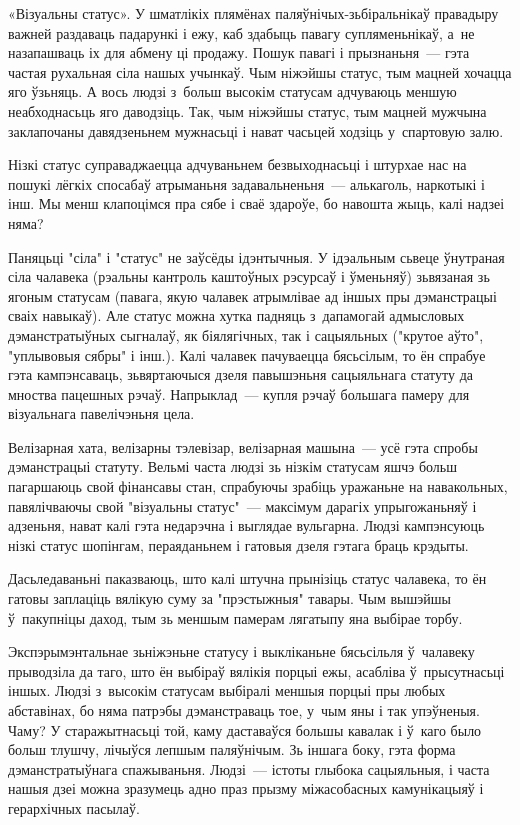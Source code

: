 «Візуальны статус». У шматлікіх плямёнах паляўнічых-зьбіральнікаў правадыру важней раздаваць падарункі і ежу, каб здабыць павагу супляменьнікаў, а~не назапашваць іх для абмену ці продажу. Пошук павагі і прызнаньня~--- гэта частая рухальная сіла нашых учынкаў. Чым ніжэйшы статус, тым мацней хочацца яго ўзьняць. А вось людзі з~больш высокім статусам адчуваюць меншую неабходнасьць яго даводзіць. Так, чым ніжэйшы статус, тым мацней мужчына заклапочаны давядзеньнем мужнасьці і нават часьцей ходзіць у~спартовую залю.

Нізкі статус суправаджаецца адчуваньнем безвыходнасьці і штурхае нас на пошукі лёгкіх спосабаў атрыманьня задавальненьня~--- алькаголь, наркотыкі і інш. Мы менш клапоцімся пра сябе і сваё здароўе, бо навошта жыць, калі надзеі няма?

Паняцьці "сіла" і "статус" не заўсёды ідэнтычныя. У ідэальным сьвеце ўнутраная сіла чалавека (рэальны кантроль каштоўных рэсурсаў і ўменьняў) зьвязаная зь ягоным статусам (павага, якую чалавек атрымлівае ад іншых пры дэманстрацыі сваіх навыкаў). Але статус можна хутка падняць з~дапамогай адмысловых дэманстратыўных сыгналаў, як біялягічных, так і сацыяльных ("крутое аўто", "уплывовыя сябры" і інш.). Калі чалавек пачуваецца бясьсілым, то ён спрабуе гэта кампэнсаваць, зьвяртаючыся дзеля павышэньня сацыяльнага статуту да мноства пацешных рэчаў. Напрыклад~--- купля рэчаў большага памеру для візуальнага павелічэньня цела.

Велізарная хата, велізарны тэлевізар, велізарная машына~--- усё гэта спробы дэманстрацыі статуту. Вельмі часта людзі зь нізкім статусам яшчэ больш пагаршаюць свой фінансавы стан, спрабуючы зрабіць уражаньне на навакольных, павялічваючы свой "візуальны статус"~--- максімум дарагіх упрыгожаньняў і адзеньня, нават калі гэта недарэчна і выглядае вульгарна. Людзі кампэнсуюць нізкі статус шопінгам, пераяданьнем і гатовыя дзеля гэтага браць крэдыты.

Дасьледаваньні паказваюць, што калі штучна прынізіць статус чалавека, то ён гатовы заплаціць вялікую суму за "прэстыжныя" тавары. Чым вышэйшы ў~пакупніцы даход, тым зь меншым памерам лягатыпу яна выбірае торбу.

Экспэрымэнтальнае зьніжэньне статусу і выкліканьне бясьсільля ў~чалавеку прыводзіла да таго, што ён выбіраў вялікія порцыі ежы, асабліва ў~прысутнасьці іншых. Людзі з~высокім статусам выбіралі меншыя порцыі пры любых абставінах, бо няма патрэбы дэманстраваць тое, у~чым яны і так упэўненыя. Чаму? У старажытнасьці той, каму даставаўся большы кавалак і ў~каго было больш тлушчу, лічыўся лепшым паляўнічым. Зь іншага боку, гэта форма дэманстратыўнага спажываньня. Людзі~--- істоты глыбока сацыяльныя, і часта нашыя дзеі можна зразумець адно праз прызму міжасобасных камунікацыяў і герархічных пасылаў.

